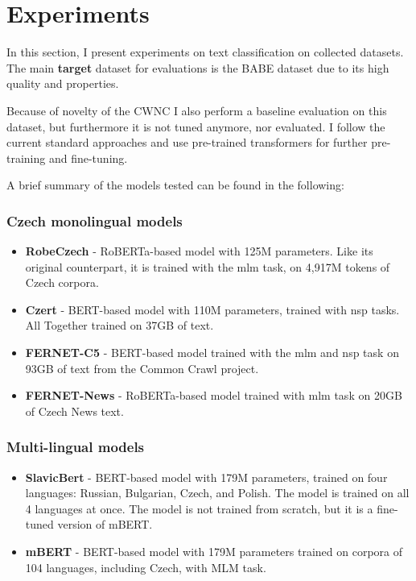 \chapter{Experiments}\label{experiments}
In this section, I present experiments on text classification on collected datasets. The main \textbf{target} dataset for evaluations is the BABE dataset due to its high quality and properties.

Because of novelty of the CWNC I also perform a baseline evaluation on this dataset, but furthermore it is not tuned anymore, nor evaluated.
I follow the current standard approaches and use pre-trained transformers for further pre-training and fine-tuning. 

A brief summary of the models tested can be found in the following:




\subsection{Czech monolingual models}
\begin{itemize}
    \item \textbf{RobeCzech} \cite{strakarobeczech} - RoBERTa-based model with 125M parameters. Like its original counterpart, it is trained with the \gls{mlm} task, on 4,917M tokens of Czech corpora.
    \item \textbf{Czert} \cite{sido-etal-2021-czert} - BERT-based model with 110M parameters, trained with \gls{nsp} tasks. All Together trained on 37GB of text. 
    \item \textbf{FERNET-C5} \cite{lehevcka2021comparison} - BERT-based model trained with the \gls{mlm} and \gls{nsp} task on 93GB of text from the Common Crawl project.
    \item \textbf{FERNET-News} \cite{lehevcka2021comparison} - RoBERTa-based model trained with \gls{mlm} task on 20GB of Czech News text.
\end{itemize}




\subsection{Multi-lingual models}
\begin{itemize}
    \item \textbf{SlavicBert} \cite{arkhipov2019tuning} - BERT-based model with 179M parameters, trained on four languages: Russian, Bulgarian, Czech, and Polish. The model is trained on all 4 languages at once. The model is not trained from scratch, but it is a fine-tuned version of mBERT.
    \item \textbf{mBERT} \cite{devlin2019bert} - BERT-based model with 179M parameters trained on corpora of 104 languages, including Czech, with MLM task.
\end{itemize}




